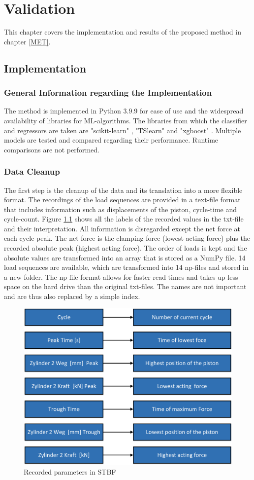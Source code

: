 \chapter{Validation}\label{Validation}
This chapter covers the implementation and results of the proposed method in chapter \ref{MET}.

\section{Implementation}
\subsection{General Information regarding the Implementation}
The method is implemented in Python 3.9.9 for ease of use and the widespread availability of libraries for ML-algorithms.
The libraries from which the classifier and regressors are taken are "scikit-learn" \cite{SKlearn}, "TSlearn" \cite{tslearn} and "xgboost" \cite{XG}.
Multiple models are tested and compared regarding their performance. Runtime comparisons are not performed.
\subsection{Data Cleanup}
The first step is the cleanup of the data and its translation into a more flexible format. The recordings of the load sequences are provided in a text-file format that includes information such as displacements of the piston, cycle-time and cycle-count.
Figure \ref{fig:recordinglabel} shows all the labels of the recorded values in the txt-file and their interpretation. All information is disregarded except the net force at each cycle-peak. The net force is the clamping force (lowest acting force) plus the recorded absolute peak (highest acting force). The order of loads is kept and the absolute values are transformed into an array that is stored as a NumPy file. 14 load sequences are available, which are transformed into 14 np-files and stored in a new folder. The np-file format allows for faster read times and takes up less space on the hard drive than the original txt-files. The names are not important and are thus also replaced by a simple index.


\begin{figure}[H]
	\centering
	\includegraphics[width=0.75\linewidth]{IMGs/recordinglabel.png}
	\caption{Recorded parameters in STBF}
	\label{fig:recordinglabel}
\end{figure}

